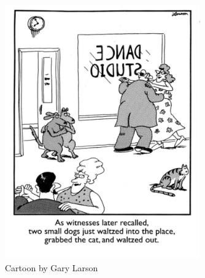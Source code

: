 \documentclass[draft,final,oneside]{vutinfth} %
\newenvironment{dedication}
  {%
   \thispagestyle{empty}%
   \vspace*{\stretch{1}}%
   \itshape             %
   \raggedleft          %
  }
  {\par %
   \vspace{\stretch{3}} %
   \clearpage           %
  }
\begin{document}
\frontmatter %

\addstatementpage

\begin{danksagung*}
\end{danksagung*}

\begin{acknowledgements*}
\end{acknowledgements*}

\begin{kurzfassung}
\end{kurzfassung}

\begin{abstract}
\end{abstract}


\tableofcontents* %

\mainmatter

\clearpage\thispagestyle{empty}\addtocounter{page}{-1}
\begin{dedication}
\begin{figure}[ht]
	\centering
  	\includegraphics[width=0.75\textwidth]{graphics/example_cartoon.png}
	\captionsetup{labelformat=empty}
	\caption{Cartoon by Gary Larson}
	\label{fig:fig1}
\end{figure}
\end{dedication}
\clearpage
\end{document}
